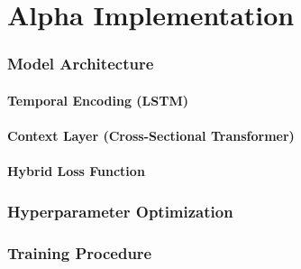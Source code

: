 \part{Alpha Implementation}

\section{Model Architecture}
\subsection{Temporal Encoding (\acs{LSTM})}
\subsection{Context Layer (Cross-Sectional Transformer)}
\subsection{Hybrid Loss Function}

\section{Hyperparameter Optimization}

\section{Training Procedure}